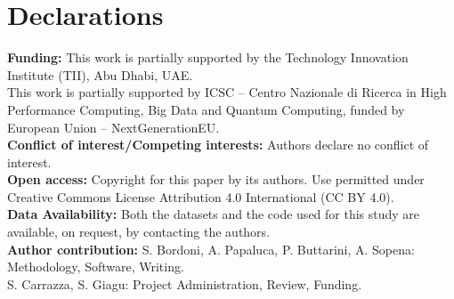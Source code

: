 \documentclass[sn-basic]{sn-jnl} %
\begin{document}
\backmatter

\section*{Declarations}

\textbf{Funding:} 
This work is partially supported by the Technology Innovation Institute (TII), Abu Dhabi, UAE.\\
This work is partially supported by ICSC – Centro Nazionale di Ricerca in High Performance Computing, 
Big Data and Quantum Computing, funded by European Union – NextGenerationEU.\\

\noindent
\textbf{Conflict of interest/Competing interests:}
Authors declare no conflict of interest.\\

\noindent
\textbf{Open access:}
Copyright for this paper by its authors. Use permitted under Creative Commons License Attribution 4.0 International (CC BY 4.0).\\

\noindent
\textbf{Data Availability:} Both the datasets and the code used for this study are available, on request, by contacting
the authors.\\

\noindent
\textbf{Author contribution:} 
S. Bordoni, A. Papaluca, P. Buttarini, A. Sopena: Methodology, Software, Writing.\\
S. Carrazza, S. Giagu: Project Administration, Review, Funding.\\



\end{document}
